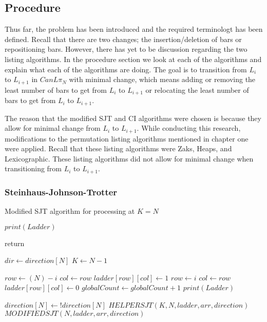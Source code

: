 \subsection{Procedure}

Thus far, the problem has been introduced and the required terminologt has been defined. Recall that there are two 
changes; the insertion/deletion of bars or repositioning bars.
However, there has yet to be discussion regarding the two 
listing algorithms. In the procedure section 
we look at each of the algorithms and explain what 
each of the algorithms are doing. The goal is to transition from 
$L_{i}$ to $L_{i+1}$ in $CanL{\pi_{N}}$ with minimal change, which means adding or removing 
the least number of bars to get from $L_{i}$ to $L_{i+1}$ or relocating 
the least number of bars to get from $L_{i}$ to $L_{i+1}$.\par 

The reason that the modified SJT and CI algorithms were chosen is because they allow 
for minimal change from $L_{i}$ to $L_{i+1}$. While conducting this research, modifications 
to the permutation listing algorithms mentioned in chapter one were applied. Recall that 
these listing algorithms were Zaks, Heaps, and Lexicographic. These listing algorithms 
did not allow for minimal change when transitioning from $L_{i}$ to $L_{i+1}$.
\subsubsection{Steinhaus-Johnson-Trotter}
\begin{algorithm}
  \caption{Modified SJT algorithm for processing at $K=N$}
  \begin{algorithmic}[1]


      \State $print(Ladder)$

        \State return
      \EndIf

     
      \State $dir \gets direction[N]$
      \State $K \gets N-1$
        
            \State $row \gets (N) - i$
            \State $col \gets row$
            \State $ladder[row][col] \gets 1$
        \Else
            \State $row \gets i$
            \State $col \gets row$
            \State $ladder[row][col] \gets 0$
        \EndIf
        \State $globalCount \gets globalCount+1$
        \State $print(Ladder)$

      \EndFor
      \State $direction[N] \gets !direction[N]$
      \State $HELPERSJT(K, N, ladder, arr, direction)$
      \State $MODIFIEDSJT(N,  ladder, arr, direction)$

    \EndFunction
  \end{algorithmic}
\end{algorithm}

